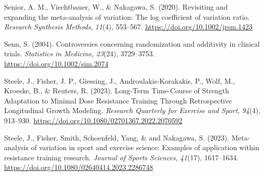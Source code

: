 \documentclass[
]{article}
\newlength{\cslhangindent}
\newenvironment{CSLReferences}[2] %
 {\begin{list}{}{%
  \setlength{\itemindent}{0pt}
  \setlength{\leftmargin}{0pt}
  \setlength{\parsep}{0pt}
  \ifodd #1
   \setlength{\leftmargin}{\cslhangindent}
   \setlength{\itemindent}{-1\cslhangindent}
  \fi
  \setlength{\itemsep}{#2\baselineskip}}}
 {\end{list}}
\begin{document}
\begin{CSLReferences}{1}{0}
Senior, A. M., Viechtbauer, W., \& Nakagawa, S. (2020). Revisiting and
expanding the meta-analysis of variation: {The} log coefficient of
variation ratio. \emph{Research Synthesis Methods}, \emph{11}(4),
553--567. \url{https://doi.org/10.1002/jrsm.1423}

Senn, S. (2004). Controversies concerning randomization and additivity
in clinical trials. \emph{Statistics in Medicine}, \emph{23}(24),
3729--3753. \url{https://doi.org/10.1002/sim.2074}

Steele, J., Fisher, J. P., Giessing, J., Androulakis-Korakakis, P.,
Wolf, M., Kroeske, B., \& Reuters, R. (2023). Long-{Term Time-Course} of
{Strength Adaptation} to {Minimal Dose Resistance Training Through
Retrospective Longitudinal Growth Modeling}. \emph{Research Quarterly
for Exercise and Sport}, \emph{94}(4), 913--930.
\url{https://doi.org/10.1080/02701367.2022.2070592}

{Steele, J., Fisher, Smith, Schoenfeld, Yang, \& and Nakagawa, S.}
(2023). Meta-analysis of variation in sport and exercise science:
{Examples} of application within resistance training research.
\emph{Journal of Sports Sciences}, \emph{41}(17), 1617--1634.
\url{https://doi.org/10.1080/02640414.2023.2286748}

\end{CSLReferences}
\end{document}
